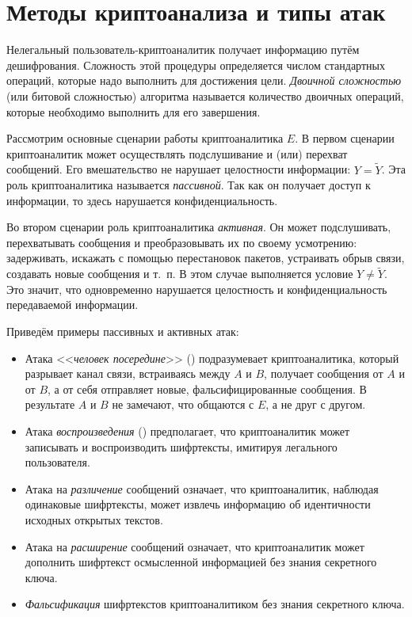 \section{Методы криптоанализа и типы атак}

Нелегальный пользователь-криптоаналитик получает информацию путём дешифрования. Сложность этой процедуры определяется числом стандартных операций, которые надо выполнить для достижения цели. \emph{Двоичной сложностью} (или битовой сложностью) алгоритма называется количество двоичных операций, которые необходимо выполнить для его завершения.

Рассмотрим основные сценарии работы криптоаналитика $E$. В первом сценарии криптоаналитик может осуществлять подслушивание и (или) перехват сообщений. Его вмешательство не нарушает целостности информации: $Y=\widetilde{Y}$. Эта роль криптоаналитика называется \emph{пассивной}. Так как он получает доступ к информации, то здесь нарушается конфиденциальность.

Во втором сценарии роль криптоаналитика \emph{активная}. Он может подслушивать, перехватывать сообщения и преобразовывать их по своему усмотрению: задерживать, искажать с помощью перестановок пакетов, устраивать обрыв связи, создавать новые сообщения и т.~п. В этом случае выполняется условие $Y \neq \widetilde{Y}$. Это значит, что одновременно нарушается целостность и конфиденциальность передаваемой информации.

Приведём примеры пассивных и активных атак:
\begin{itemize}
    \item Атака <<\emph{человек посередине}>> () подразумевает криптоаналитика, который разрывает канал связи, встраиваясь между $A$ и $B$, получает сообщения от $A$ и от $B$, а от себя отправляет новые, фальсифицированные сообщения. В результате $A$ и $B$ не замечают, что общаются с $E$, а не друг с другом.
    \item Атака \emph{воспроизведения} () предполагает, что криптоаналитик может записывать и воспроизводить шифртексты, имитируя легального пользователя.
    \item Атака на \emph{различение} сообщений означает, что криптоаналитик, наблюдая одинаковые шифртексты, может извлечь информацию об идентичности исходных открытых текстов.
    \item Атака на \emph{расширение} сообщений означает, что криптоаналитик может дополнить шифртекст осмысленной информацией без знания секретного ключа.
    \item \emph{Фальсификация} шифртекстов криптоаналитиком без знания секретного ключа.
\end{itemize}

